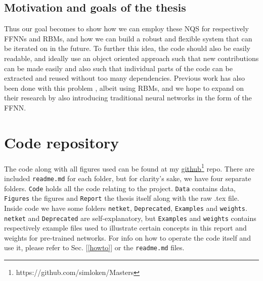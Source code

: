 \documentclass[12pt]{article}
\begin{document}
{\subsection{Motivation and goals of the thesis}
Thus our goal becomes to show how we can employ these NQS for respectively FFNNs and RBMs, and how we can build a robust and flexible system that can be iterated on in the future. To further this idea, the code should also be easily readable, and ideally use an object oriented approach such that new contributions can be made easily and also such that individual parts of the code can be extracted and reused without too many dependencies. Previous work has also been done with this problem \cite{flugsrud} \cite{nordhagen}, albeit using RBMs, and we hope to expand on their research by also introducing traditional neural networks in the form of the FFNN.
\section{Code repository} \label{git}
The code along with all figures used can be found at my \href{https://github.com/simloken/Masters}{github}\footnote{https://github.com/simloken/Masters} repo. There are included \texttt{readme.md} for each folder, but for clarity's sake, we have four separate folders. \texttt{Code} holds all the code relating to the project. \texttt{Data} contains data, \texttt{Figures} the figures and \texttt{Report} the thesis itself along with the raw .tex file. Inside code we have some folders \texttt{netket}, \texttt{Deprecated}, \texttt{Examples} and \texttt{weights}. \texttt{netket} and \texttt{Deprecated} are self-explanatory, but \texttt{Examples} and \texttt{weights} contains respectively example files used to illustrate certain concepts in this report and weights for pre-trained networks. \newline
For info on how to operate the code itself and use it, please refer to Sec. [\ref{howto}] or the \texttt{readme.md} files.
}
\end{document}
